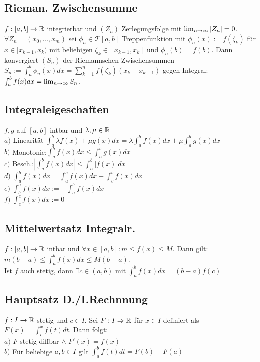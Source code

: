 \subsection*{Rieman. Zwischensumme}
$f:[a, b] \rightarrow \mathbb R$ integrierbar und $(Z_n)$ Zerlegungsfolge mit $\lim_{n \rightarrow \infty} |Z_n| = 0$. $\forall Z_n = (x_0, ..., x_m)$ sei $\phi_n \in \mathcal{T}[a,b]$ Treppenfunktion mit $\phi_n(x) := f(\zeta_k)$ für $x \in [x_{k - 1}, x_k)$ mit beliebigen $\zeta_k \in [x_{k - 1}, x_k]$ und $\phi_n(b) = f(b)$. Dann konvergiert $(S_n)$ der Riemannschen Zwischensummen $S_n := \int_a^b \phi_n(x) dx = \sum_{k = 1}^n f(\zeta_k) (x_k - x_{k-1})$ gegen Integral: $\int_{a}^b f(x) dx = \lim_{n \rightarrow \infty} S_n$.
\subsection*{Integraleigeschaften}
$f, g$ auf $[a, b]$ intbar und $\lambda, \mu \in \mathbb R$\\
    $a) $ Linearität $\int_a^b \lambda f(x) + \mu g(x) dx = \lambda\int_a^b f(x) dx + \mu \int_a^b g(x) dx$\\
    $b) $ Monotonie:$\int_a^b f(x) dx \leq \int_a^b g(x) dx$\\
    $c) $ Besch.:$\left|\int_a^b f(x) dx\right| \leq \int_a^b |f(x)| dx$\\
    $d) $ \small$\int_a^b f(x) dx = \int_a^c f(x) dx + \int_c^b f(x) dx$\\
    $e) $ $\int_b^a f(x) dx := - \int_a^b f(x) dx$\\
    $f) $ $\int_c^c f(x) dx := 0$
\subsection*{Mittelwertsatz Integralr.}
$f:[a, b]\rightarrow \mathbb R$ intbar und $\forall x \in [a, b]: m \leq f(x) \leq M$. Dann gilt: $m(b - a) \leq \int_a^b f(x) dx \leq M(b - a)$. \\
Ist $f$ auch stetig, dann $\exists c \in (a, b)$ mit $\int_a^b f(x) dx = (b - a)f(c)$
\subsection*{Hauptsatz D./I.Rechnnung}
$f: I \rightarrow \mathbb R$ stetig und $c \in I$. Sei $F: I \Rightarrow \mathbb R$ für $x \in I$ definiert als $F(x) = \int_c^x f(t) dt$. Dann folgt:\\
    $a)$ $F$ stetig diffbar $\land$ $F'(x) = f(x)$\\
    $b)$ Für beliebige $a, b \in I$ gilt $\int_a^b f(t) dt = F(b) - F(a)$
